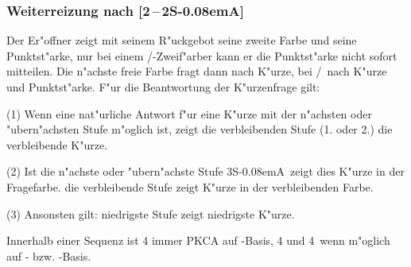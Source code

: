 \documentclass[11pt,german,twocolumn]{scrartcl}
\def\pik{\nobreak\hspace{\cardskip}\Sp\xspace}
\def\coe{\nobreak\hspace{\cardskip}\He\xspace}
\def\kar{\nobreak\hspace{\cardskip}\Di\xspace}
\def\tre{\nobreak\hspace{\cardskip}\Cl\xspace}
\def\co{\He\xspace}
\def\ka{\Di\xspace}
\def\tr{\Cl\xspace}
\def\sa{\nobreak\textsf{S\kern-0.08emA}\xspace}
\def\SA{\nobreak\hspace{\cardskip}\sa}
\def\sep{\,--\,}
\begin{document}
\subsubsection{Weiterreizung nach [2\coe{}\sep2\SA]}

Der Er"offner zeigt mit seinem R"uckgebot seine zweite Farbe und seine
Punktst"arke, nur bei einem \co/\tr-Zweif"arber kann er die Punktst"arke nicht
sofort mitteilen. Die n"achste freie Farbe fragt dann nach K"urze, bei \co/\tr\
nach K"urze und Punktst"arke. F"ur die Beantwortung der K"urzenfrage gilt:

(1) Wenn eine nat"urliche Antwort f"ur eine K"urze mit der n"achsten oder
"ubern"achsten Stufe m"oglich ist, zeigt die verbleibenden Stufe (1. oder 2.)
die verbleibende K"urze.

(2) Ist die n"achste oder "ubern"achste Stufe 3\SA\, zeigt dies K"urze in der
Fragefarbe. die verbleibende Stufe zeigt K"urze in der verbleibenden Farbe.

(3) Ansonsten gilt: niedrigste Stufe zeigt niedrigste K"urze.

Innerhalb einer Sequenz ist 4\pik immer PKCA auf \co-Basis, 4\tre und 4\kar\
wenn m"oglich auf \tr- bzw. \ka-Basis.
\end{document}
